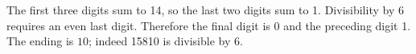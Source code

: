The first three digits sum to 14, so the last two digits sum to 1. Divisibility by 6 requires an even last digit. Therefore the final digit is 0 and the preceding digit 1. The ending is $\boxed{10}$; indeed 15810 is divisible by 6.
